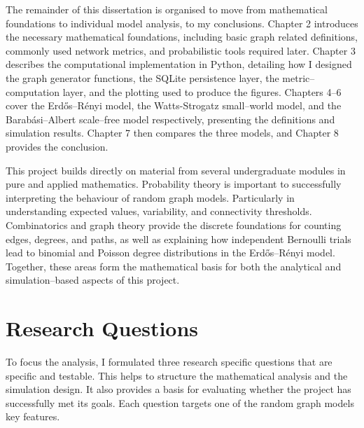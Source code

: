 \documentclass[12pt, a4paper]{report}
\theoremstyle{definition}
\theoremstyle{plain}
\theoremstyle{remark}
\begin{document}
The remainder of this dissertation is organised to move from
mathematical foundations to individual model analysis,
to my conclusions. Chapter 2 introduces the necessary mathematical
foundations, including basic graph related definitions, commonly
used network metrics, and probabilistic tools required later.
Chapter 3 describes the computational implementation in Python,
detailing how I designed the graph generator functions, the SQLite
persistence layer, the metric--computation layer, and the plotting
used to produce the figures. Chapters 4--6 cover the
Erd\H{o}s--R\'enyi model, the Watts-Strogatz small--world model,
and the Barab\'asi--Albert scale--free model respectively,
presenting the definitions and simulation results. Chapter 7 then
compares the three models, and Chapter 8 provides the conclusion.

This project builds directly on material from several undergraduate
modules in pure and applied mathematics. Probability theory is important
to successfully interpreting the behaviour of random graph models.
Particularly in understanding expected values, variability, and
connectivity thresholds. Combinatorics and graph theory provide the
discrete foundations for counting edges, degrees, and paths, as well as
explaining how independent Bernoulli trials lead to binomial and Poisson
degree distributions in the Erd\H{o}s--R\'enyi model. Together, these
areas form the mathematical basis for both the analytical and
simulation--based aspects of this project.


\section{Research Questions}
\label{sec:rqs}

To focus the analysis, I formulated three research specific questions
that are specific and testable. This helps to structure the mathematical
analysis and the simulation design. It also provides a basis for
evaluating whether the project has successfully met its goals. Each
question targets one of the random graph models key features.
\end{document}
